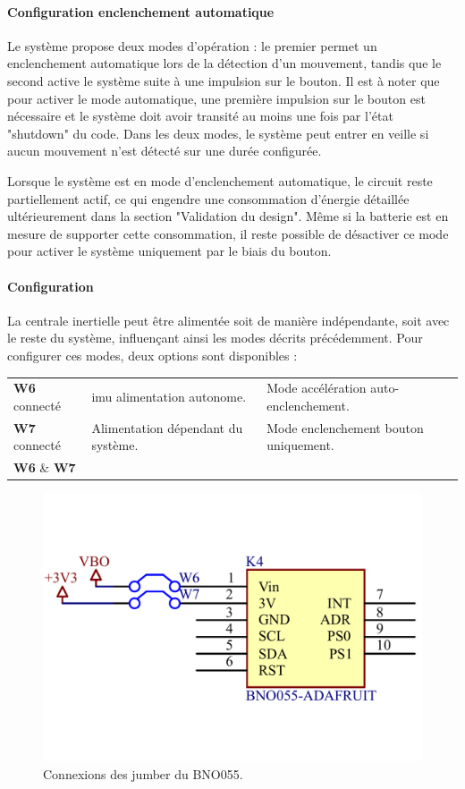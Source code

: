 \clearpage

\paragraph{Configuration enclenchement automatique}

Le système propose deux modes d'opération : le premier permet un enclenchement automatique lors de la détection d'un mouvement, tandis que le second active le système suite à une impulsion sur le bouton. Il est à noter que pour activer le mode automatique, une première impulsion sur le bouton est nécessaire et le système doit avoir transité au moins une fois par l'état "shutdown" du code. Dans les deux modes, le système peut entrer en veille si aucun mouvement n'est détecté sur une durée configurée.

Lorsque le système est en mode d'enclenchement automatique, le circuit reste partiellement actif, ce qui engendre une consommation d'énergie détaillée ultérieurement dans la section "Validation du design". Même si la batterie est en mesure de supporter cette consommation, il reste possible de désactiver ce mode pour activer le système uniquement par le biais du bouton.

\paragraph*{Configuration} La centrale inertielle peut être alimentée soit de manière indépendante, soit avec le reste du système, influençant ainsi les modes décrits précédemment. Pour configurer ces modes, deux options sont disponibles : \vspace*{+2mm}


\begin{tabular}{lll}
	\textbf{W6} connecté & \gls{imu} alimentation autonome. & Mode accélération auto-enclenchement. \\
	\textbf{W7} connecté & Alimentation dépendant du système. & Mode enclenchement bouton uniquement. \\
	\textbf{W6} \& \textbf{W7} & \color{red}{Connexion à éviter !} & \\
\end{tabular}

\begin{figure}[h]
	\centering
	\includegraphics[width=0.7\linewidth]{../figures/code/jumper-config-mode-IMU}
	\caption{Connexions des jumber du BNO055.}
	\label{fig:jumper-config-mode-imu}
\end{figure}

